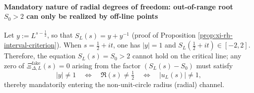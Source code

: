 

\paragraph{Mandatory nature of radial degrees of freedom: out-of-range root \texorpdfstring{$S_0>2$}{S0>2} can only be realized by off-line points}
Let \(y:=L^{s-\tfrac12}\), so that \(S_L(s)=y+y^{-1}\) (proof of Proposition \ref{prop:xi-rh-interval-criterion}).
When \(s=\tfrac12+it\), one has \(|y|=1\) and \(S_L(\tfrac12+it)\in[-2,2]\).
Therefore, the equation
\(
S_L(s)=S_0>2
\)
cannot hold on the critical line; any zero of \(\Xi^{\mathrm{fake}}_{\Delta,L}(s)=0\) arising from the factor \((S_L(s)-S_0)\) must satisfy
\[
|y|\neq 1
\quad\Longleftrightarrow\quad
\Re(s)\neq\tfrac12
\quad\Longleftrightarrow\quad
|u_L(s)|\neq 1,
\]
thereby mandatorily entering the non-unit-circle radius (radial) channel.

